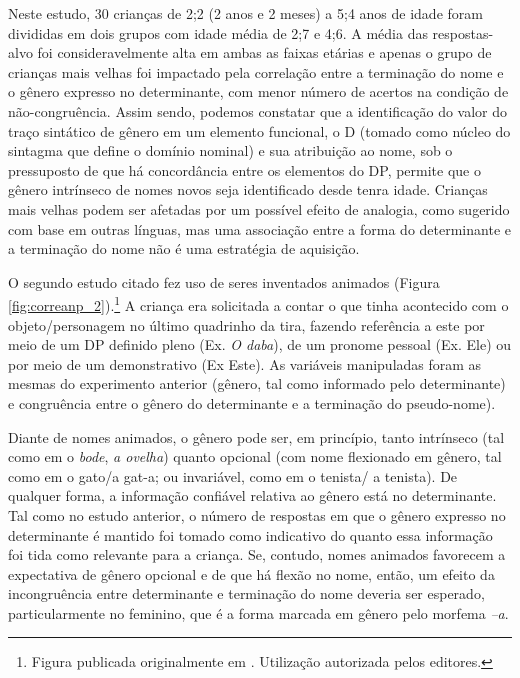 \documentclass[output=paper]{LSP/langsci}
\begin{document}
Neste estudo, 30 crianças de 2;2 (2 anos e 2 meses) a 5;4 anos de idade foram divididas em dois grupos com idade média de 2;7 e 4;6.  A média das respostas-alvo foi consideravelmente alta em ambas as faixas etárias e apenas o grupo de crianças mais velhas foi impactado pela correlação entre a terminação do nome e o gênero expresso no determinante, com menor número de acertos na condição de não-congruência. Assim sendo, podemos constatar que a identificação do valor do traço sintático de gênero em um elemento funcional, o D (tomado como núcleo do sintagma que define o domínio nominal) e sua atribuição ao nome, sob o pressuposto de que há concordância entre os elementos do DP, permite que o gênero intrínseco de nomes novos seja identificado desde tenra idade. Crianças mais velhas podem ser afetadas por um possível efeito de analogia, como sugerido com base em outras línguas, mas uma associação entre a forma do determinante e a terminação do nome não é uma estratégia de aquisição.

O segundo estudo citado \citep{correa_etal2010} fez uso de seres inventados animados (Figura \ref{fig:correanp_2}).\footnote{Figura publicada originalmente em \citet{correa_etal2010}. Utilização autorizada pelos editores.} A criança era solicitada a contar o que tinha acontecido com o objeto/personagem no último quadrinho da tira, fazendo referência a este por meio de um DP definido pleno (Ex. \textit{O daba}), de um pronome pessoal (Ex. Ele) ou por meio de um demonstrativo (Ex Este). As variáveis manipuladas foram as mesmas do experimento anterior (gênero, tal como informado pelo determinante) e congruência entre o gênero do determinante e a terminação do pseudo-nome). 

Diante de nomes animados, o gênero pode ser, em princípio, tanto intrínseco (tal como em o \textit{bode}, \textit{a ovelha}) quanto opcional (com nome flexionado em gênero, tal como em o gato/a gat-a; ou invariável, como em o tenista/ a tenista). De qualquer forma, a informação confiável relativa ao gênero está no determinante. Tal como no estudo anterior, o número de respostas em que o gênero expresso no determinante é mantido foi tomado como indicativo do quanto essa informação foi tida como relevante para a criança. Se, contudo, nomes animados favorecem a expectativa de gênero opcional e de que há flexão no nome, então, um efeito da incongruência entre determinante e terminação do nome deveria ser esperado, particularmente no feminino, que é a forma marcada em gênero pelo morfema \textit{–a}.
\end{document}

